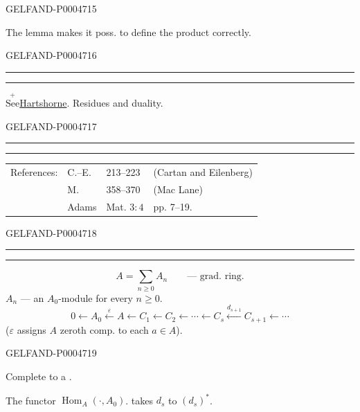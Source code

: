 \begin{GelfandAdjacentEvidence}{GELFAND-P000471}{5}

The lemma makes it poss. to define the product correctly.
\end{GelfandAdjacentEvidence}
\begin{GelfandAdjacentEvidence}{GELFAND-P000471}{6}


{\centering\rule{3em}{.4pt}\quad\textperiodcentered\quad\rule{3.5em}{.4pt}\par}
\(\overset{\scriptstyle +}{\text{See}}\)\quad\uline{Hartshorne}. Residues and duality.
\end{GelfandAdjacentEvidence}
\begin{GelfandAdjacentEvidence}{GELFAND-P000471}{7}


{\centering\rule{3.9em}{.4pt}\quad\textperiodcentered\quad\rule{3.4em}{.4pt}\par}

\begin{tabular}{@{}llll@{}}
References: & C.–E. & 213--223 & (Cartan and Eilenberg)\\
 & M. & 358--370 & (Mac Lane)\\
 & Adams & Mat. $3\colon4$ & pp. 7--19.
\end{tabular}
\end{GelfandAdjacentEvidence}
\begin{GelfandAdjacentEvidence}{GELFAND-P000471}{8}


{\centering\rule{2.8em}{.4pt}\quad\textperiodcentered\quad\rule{3em}{.4pt}\par}
\[
A=\sum_{n\geqslant0}A_n\qquad\text{— grad. ring.}
\]
$A_n$ — an $A_0$-module for every $n\geqslant0$.
\[
0\longleftarrow A_0\xleftarrow{\varepsilon}A
\longleftarrow C_1\longleftarrow C_2\longleftarrow\cdots
\longleftarrow C_s\xleftarrow{d_{s+1}}C_{s+1}\longleftarrow\cdots
\]
($\varepsilon$ assigns $A$ zeroth comp. to each $a\in A$).
\end{GelfandAdjacentEvidence}
\begin{GelfandAdjacentEvidence}{GELFAND-P000471}{9}


Complete to a .

The functor $\operatorname{Hom}_A(\cdot,A_0)$. takes $d_s$ to $(d_s)^*$.
\end{GelfandAdjacentEvidence}
